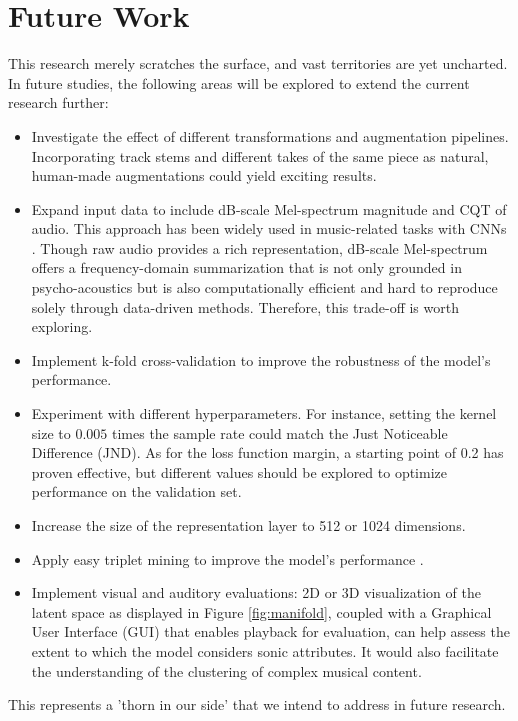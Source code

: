 \chapter{Future Work}

This research merely scratches the surface, and vast territories are yet uncharted. In future studies, the following areas will be explored to extend the current research further:

\begin{itemize}
  \item Investigate the effect of different transformations and augmentation pipelines. Incorporating track stems and different takes of the same piece as natural, human-made augmentations could yield exciting results.
  \item Expand input data to include dB-scale Mel-spectrum magnitude and CQT of audio. This approach has been widely used in music-related tasks with CNNs \cite{deepfeaturesegment, Kim2020OneStrategies}. Though raw audio provides a rich representation, dB-scale Mel-spectrum offers a frequency-domain summarization that is not only grounded in psycho-acoustics but is also computationally efficient and hard to reproduce solely through data-driven methods. Therefore, this trade-off is worth exploring.
  \item Implement k-fold cross-validation to improve the robustness of the model's performance.
  \item Experiment with different hyperparameters. For instance, setting the kernel size to $0.005$ times the sample rate could match the Just Noticeable Difference (JND). As for the loss function margin, a starting point of 0.2 has proven effective, but different values should be explored to optimize performance on the validation set.
  \item Increase the size of the representation layer to 512 or 1024 dimensions.
  \item Apply easy triplet mining to improve the model's performance \cite{XuanImprovedMining}.
  \item Implement visual and auditory evaluations: 2D or 3D visualization of the latent space as displayed in Figure \ref{fig:manifold}, coupled with a Graphical User Interface (GUI) that enables playback for evaluation, can help assess the extent to which the model considers sonic attributes. It would also facilitate the understanding of the clustering of complex musical content. 
\end{itemize}

This represents a 'thorn in our side' that we intend to address in future research.

\newpage
